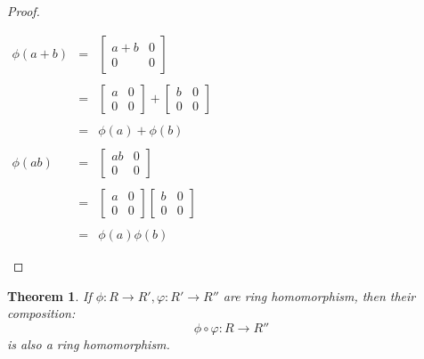 \documentclass{article}
\theoremstyle{MyNonumberplain}
\theoremstyle{break}
\newtheorem*{proof}{Proof. }
\theoremstyle{break}
\newtheorem{theorem}{Theorem}[section]
\theoremstyle{break}
\theoremstyle{definition}
\theoremstyle{break}
\begin{document}
\begin{expbox}
\begin{prfbox}
\begin{proof}
        \begin{center}
            $\begin{array}{lll}
                \phi (a + b) & = & \left[\begin{array}{cc}
                a + b & 0\\
                0 & 0
                \end{array}\right]\\\\
                & = & \left[\begin{array}{cc}
                a & 0\\
                0 & 0
                \end{array}\right] + \left[\begin{array}{cc}
                b & 0\\
                0 & 0
                \end{array}\right]\\\\
                & = & \phi (a) + \phi (b)\\\\
                \phi (a b) & = & \left[\begin{array}{cc}
                a b & 0\\
                0 & 0
                \end{array}\right]\\\\
                & = & \left[\begin{array}{cc}
                a & 0\\
                0 & 0
                \end{array}\right] \left[\begin{array}{cc}
                b & 0\\
                0 & 0
                \end{array}\right]\\\\
                & = & \phi (a) \phi (b)
            \end{array}$
        \end{center}
        \end{proof}
    \end{prfbox}
\end{expbox}

\begin{thmbox}
    \begin{theorem}
        If $\phi : R \rightarrow R', \varphi : R' \rightarrow R''$ are ring
        homomorphism, then their composition:
        \[ \phi \circ \varphi : R \rightarrow R'' \]
        is also a ring homomorphism.
    \end{theorem}
\end{thmbox}
\end{document}
